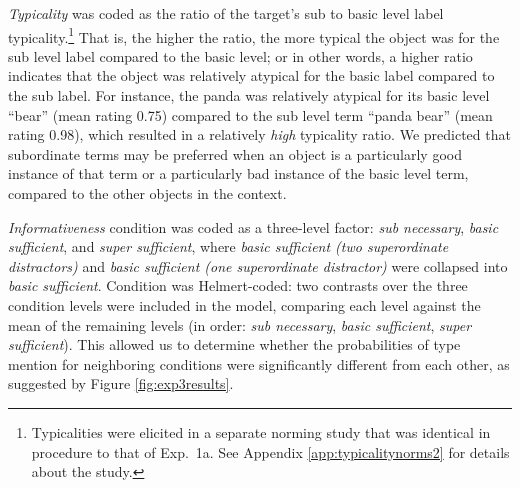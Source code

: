 \documentclass[11pt]{article}
\newcommand{\figref}[1]{Figure \ref{#1}}
\newcommand{\appref}[1]{Appendix \ref{#1}}
\begin{document}
\emph{Typicality} was coded as the ratio of the target's sub to basic level label typicality.\footnote{Typicalities were elicited in a separate norming study that was identical in procedure to that of Exp.~1a. See \appref{app:typicalitynorms2} for details about the study.} That is, the higher the ratio, the more typical the object was for the sub level label compared to the basic level; or in other words, a higher ratio indicates that the object was relatively atypical for the basic label compared to the sub label. For instance, the panda was relatively atypical for its basic level ``bear'' (mean rating 0.75) compared to the sub level term ``panda bear'' (mean rating 0.98), which resulted in a relatively \emph{high} typicality ratio. We predicted that subordinate terms may be preferred when an object is a particularly good instance of that term or a particularly bad instance of the basic level term, compared to the other objects in the context. 

\emph{Informativeness} condition was coded as a three-level factor: \emph{sub necessary}, \emph{basic sufficient}, and \emph{super sufficient}, where \emph{basic sufficient (two superordinate distractors)} and \emph{basic sufficient (one superordinate distractor)} were collapsed into \emph{basic sufficient}. Condition was Helmert-coded: two contrasts over the three condition levels were included in the model, comparing each level against the mean of the remaining levels (in order: \emph{sub necessary}, \emph{basic sufficient}, \emph{super sufficient}). This allowed us to determine whether the probabilities of type mention  for neighboring conditions were significantly different from each other, as suggested by \figref{fig:exp3results}.

%
\end{document}
